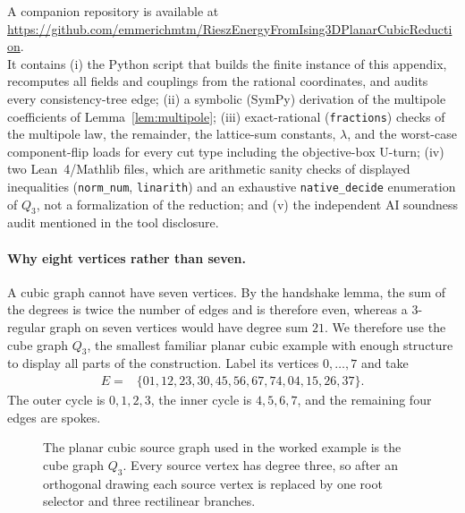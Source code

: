 \documentclass[12pt,a4paper]{article}
\begin{document}
A companion repository is available at\\
\url{https://github.com/emmerichmtm/RieszEnergyFromIsing3DPlanarCubicReduction}.\\
It contains (i) the Python script that builds the finite instance of this appendix, recomputes all fields and couplings from the rational coordinates, and audits every consistency-tree edge; (ii) a symbolic (SymPy) derivation of the multipole coefficients of Lemma~\ref{lem:multipole}; (iii) exact-rational (\texttt{fractions}) checks of the multipole law, the remainder, the lattice-sum constants, $\lambda$, and the worst-case component-flip loads for every cut type including the objective-box U-turn; (iv) two Lean~4/Mathlib files, which are arithmetic sanity checks of displayed inequalities (\texttt{norm\_num}, \texttt{linarith}) and an exhaustive \texttt{native\_decide} enumeration of $Q_3$, not a formalization of the reduction; and (v) the independent AI soundness audit mentioned in the tool disclosure.

\paragraph{Why eight vertices rather than seven.}
A cubic graph cannot have seven vertices.  By the handshake lemma, the sum of the degrees is twice the number of edges and is therefore even, whereas a $3$-regular graph on seven vertices would have degree sum $21$.  We therefore use the cube graph $Q_3$, the smallest familiar planar cubic example with enough structure to display all parts of the construction.  Label its vertices $0,\ldots,7$ and take
\begin{align*}
E={}&\{01,12,23,30,45,56,67,74,04,15,26,37\}.
\end{align*}
The outer cycle is $0,1,2,3$, the inner cycle is $4,5,6,7$, and the remaining four edges are spokes.

\begin{figure}[htbp]
\centering
{}
\caption{The planar cubic source graph used in the worked example is the cube graph $Q_3$.  Every source vertex has degree three, so after an orthogonal drawing each source vertex is replaced by one root selector and three rectilinear branches.}
\label{fig:cube-source}
\end{figure}
\end{document}
